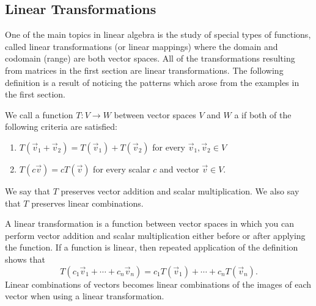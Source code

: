 \subsection{Linear Transformations}
One of the main topics in linear algebra is the study of special types of functions, called linear transformations (or linear mappings) where the domain and codomain (range) are both vector spaces.  All of the transformations resulting from matrices in the first section are linear transformations.  The following definition is a result of noticing the patterns which arose from the examples in the first section.
\begin{definition}
We call a function $T\colon V\to W$ between vector spaces $V$ and $W$
a  if both of the following criteria are satisfied:
\begin{enumerate}
	\item $T(\vec v_1+\vec v_2)=T(\vec v_1)+T(\vec v_2)$ for every $\vec v_1,\vec v_2\in V$
	\item $T(c\vec v)=cT(\vec v)$ for every scalar $c$ and vector $\vec v\in V$.
\end{enumerate}
We say that $T$ preserves vector addition and scalar multiplication.  We also say that $T$ preserves linear combinations.
\end{definition}
%
A linear transformation is a function between vector spaces in which you can perform vector addition and scalar multiplication  either before or after applying the function. 
If a function is linear, then repeated application of the definition shows that $$T(c_1\vec v_1+\cdots +c_n\vec v_n) = c_1T(\vec v_1)+\cdots +c_nT(\vec v_n).$$ Linear combinations of vectors becomes linear combinations of the images of each vector when using a linear transformation.  

